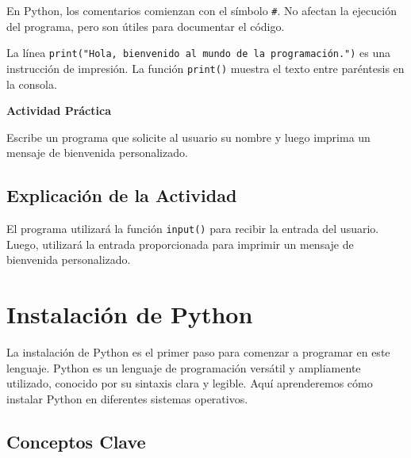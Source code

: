 \documentclass[
  a4paper,
  DIV=11,
  numbers=noendperiod,
  onepage,
  openany]{scrreprt}
\begin{document}
En Python, los comentarios comienzan con el símbolo \texttt{\#}. No
afectan la ejecución del programa, pero son útiles para documentar el
código.

La línea
\texttt{print("Hola,\ bienvenido\ al\ mundo\ de\ la\ programación.")} es
una instrucción de impresión. La función \texttt{print()} muestra el
texto entre paréntesis en la consola.

\begin{tcolorbox}[enhanced jigsaw, breakable, left=2mm, arc=.35mm, colframe=quarto-callout-tip-color-frame, colbacktitle=quarto-callout-tip-color!10!white, coltitle=black, title=\textcolor{quarto-callout-tip-color}{\faLightbulb}\hspace{0.5em}{Tip}, toprule=.15mm, leftrule=.75mm, bottomrule=.15mm, opacitybacktitle=0.6, opacityback=0, colback=white, toptitle=1mm, titlerule=0mm, rightrule=.15mm, bottomtitle=1mm]

\textbf{Actividad Práctica}

Escribe un programa que solicite al usuario su nombre y luego imprima un
mensaje de bienvenida personalizado.

\end{tcolorbox}

\section{Explicación de la
Actividad}\label{explicaciuxf3n-de-la-actividad}

El programa utilizará la función \texttt{input()} para recibir la
entrada del usuario. Luego, utilizará la entrada proporcionada para
imprimir un mensaje de bienvenida personalizado.

\chapter{Instalación de Python}\label{instalaciuxf3n-de-python}

La instalación de Python es el primer paso para comenzar a programar en
este lenguaje. Python es un lenguaje de programación versátil y
ampliamente utilizado, conocido por su sintaxis clara y legible. Aquí
aprenderemos cómo instalar Python en diferentes sistemas operativos.

\section{Conceptos Clave}\label{conceptos-clave-1}
\end{document}
